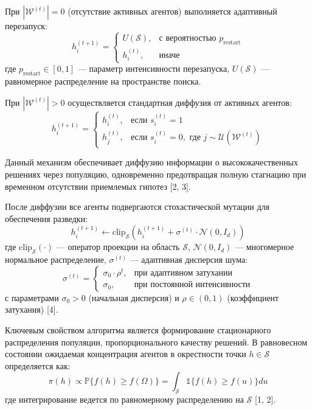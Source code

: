 \documentclass{article}
\newcommand{\1}{\mathds{1}}
\begin{document}
При $|\mathcal{W}^{(t)}| = 0$ (отсутствие активных агентов) выполняется адаптивный перезапуск:
\begin{equation}
    h_i^{(t+1)} = \begin{cases}
        U(\mathcal{S}), & \text{с вероятностью } p_{\text{restart}} \\
        h_i^{(t)}, & \text{иначе}
    \end{cases}
\end{equation}
где $p_{\text{restart}} \in [0,1]$ — параметр интенсивности перезапуска, $U(\mathcal{S})$ — равномерное распределение на пространстве поиска.

При $|\mathcal{W}^{(t)}| > 0$ осуществляется стандартная диффузия от активных агентов:
\begin{equation}
    h_i^{(t+1)} = \begin{cases}
        h_i^{(t)}, & \text{если } s_i^{(t)} = 1 \\
        h_j^{(t)}, & \text{если } s_i^{(t)} = 0, \text{ где } j \sim \mathcal{U}(\mathcal{W}^{(t)})
    \end{cases}
\end{equation}

Данный механизм обеспечивает диффузию информации о высококачественных решениях через популяцию, одновременно предотвращая полную стагнацию при временном отсутствии приемлемых гипотез [2, 3].

После диффузии все агенты подвергаются стохастической мутации для обеспечения разведки:
\begin{equation}
    h_i^{(t+1)} \gets \text{clip}_{\mathcal{S}}\left(h_i^{(t+1)} + \sigma^{(t)} \cdot \mathcal{N}(0, I_d)\right)
\end{equation}
где $\text{clip}_{\mathcal{S}}(\cdot)$ — оператор проекции на область $\mathcal{S}$, $\mathcal{N}(0, I_d)$ — многомерное нормальное распределение, $\sigma^{(t)}$ — адаптивная дисперсия шума:
\begin{equation}
    \sigma^{(t)} = \begin{cases}
        \sigma _0 \cdot \rho^t, & \text{при адаптивном затухании} \\
        \sigma _0, & \text{при постоянной интенсивности}
    \end{cases}
\end{equation}
с параметрами $\sigma_0 > 0$ (начальная дисперсия) и $\rho \in (0,1)$ (коэффициент затухания) [4].

Ключевым свойством алгоритма является формирование стационарного распределения популяции, пропорционального качеству решений. В равновесном состоянии ожидаемая концентрация агентов в окрестности точки $h \in \mathcal{S}$ определяется как:
\begin{equation}
    \pi(h) \propto \mathbb{P}\{f(h) \geq f(\Omega)\} = \int_{\mathcal{S}} \mathbb{1} \{f(h) \geq f(u)\} du
\end{equation}
где интегрирование ведется по равномерному распределению на $\mathcal{S}$ [1, 2].
\end{document}
